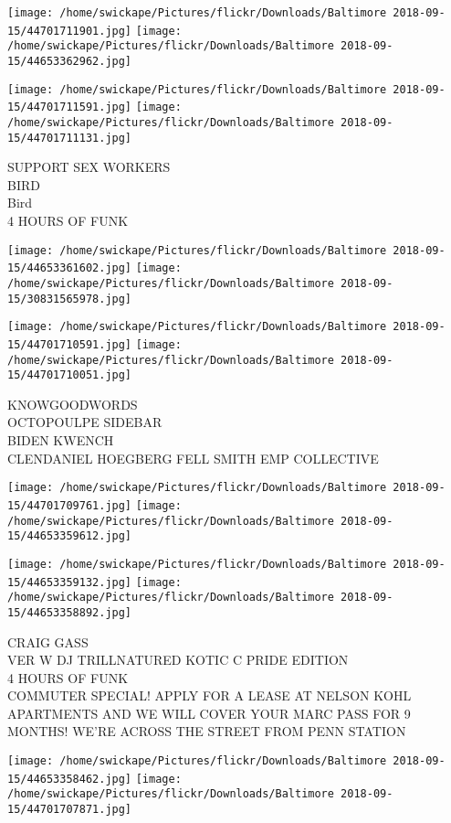 \documentclass[10pt,letterpaper]{article}
\begin{document}
\texttt{[image: /home/swickape/Pictures/flickr/Downloads/Baltimore 2018-09-15/44701711901.jpg]}
\texttt{[image: /home/swickape/Pictures/flickr/Downloads/Baltimore 2018-09-15/44653362962.jpg]}

\texttt{[image: /home/swickape/Pictures/flickr/Downloads/Baltimore 2018-09-15/44701711591.jpg]}
\texttt{[image: /home/swickape/Pictures/flickr/Downloads/Baltimore 2018-09-15/44701711131.jpg]}

SUPPORT SEX WORKERS\\
BIRD\\
Bird\\
4 HOURS OF FUNK
\pagebreak

\texttt{[image: /home/swickape/Pictures/flickr/Downloads/Baltimore 2018-09-15/44653361602.jpg]}
\texttt{[image: /home/swickape/Pictures/flickr/Downloads/Baltimore 2018-09-15/30831565978.jpg]}

\texttt{[image: /home/swickape/Pictures/flickr/Downloads/Baltimore 2018-09-15/44701710591.jpg]}
\texttt{[image: /home/swickape/Pictures/flickr/Downloads/Baltimore 2018-09-15/44701710051.jpg]}

KNOWGOODWORDS\\
OCTOPOULPE SIDEBAR\\
BIDEN KWENCH\\
CLENDANIEL HOEGBERG FELL SMITH EMP COLLECTIVE
\pagebreak

\texttt{[image: /home/swickape/Pictures/flickr/Downloads/Baltimore 2018-09-15/44701709761.jpg]}
\texttt{[image: /home/swickape/Pictures/flickr/Downloads/Baltimore 2018-09-15/44653359612.jpg]}

\texttt{[image: /home/swickape/Pictures/flickr/Downloads/Baltimore 2018-09-15/44653359132.jpg]}
\texttt{[image: /home/swickape/Pictures/flickr/Downloads/Baltimore 2018-09-15/44653358892.jpg]}

CRAIG GASS\\
VER W DJ TRILLNATURED KOTIC C PRIDE EDITION\\
4 HOURS OF FUNK\\
COMMUTER SPECIAL!  APPLY FOR A LEASE AT NELSON KOHL APARTMENTS AND WE WILL COVER YOUR MARC PASS FOR 9 MONTHS!  WE'RE ACROSS THE STREET FROM PENN STATION
\pagebreak

\texttt{[image: /home/swickape/Pictures/flickr/Downloads/Baltimore 2018-09-15/44653358462.jpg]}
\texttt{[image: /home/swickape/Pictures/flickr/Downloads/Baltimore 2018-09-15/44701707871.jpg]}
\end{document}
